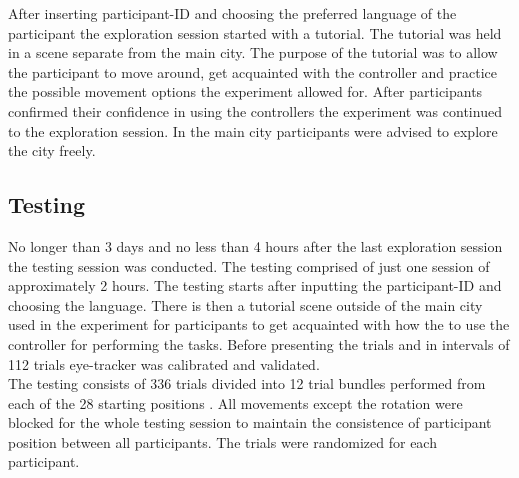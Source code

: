 After inserting participant-ID and choosing the preferred language of the participant the exploration session started with a tutorial. The tutorial was held in a scene separate from the main city. The purpose of the tutorial was to allow the participant to move around, get acquainted with the controller and practice the possible movement options the experiment allowed for. After participants confirmed their confidence in using the controllers the experiment was continued to the exploration session. In the main city participants were advised to explore the city freely.

\subsection{Testing}

No longer than 3 days and no less than 4 hours after the last exploration session the testing session was conducted. The testing comprised of just one session of approximately 2 hours. The testing starts after inputting the participant-ID and choosing the language. There is then a tutorial scene outside of the main city used in the experiment for participants to get acquainted with how the to use the controller for performing the tasks. Before presenting the trials and in intervals of 112 trials eye-tracker was calibrated and validated. \\

The testing consists of 336 trials divided into 12 trial bundles performed from each of the 28 starting positions . All movements except the rotation were blocked for the whole testing session to maintain the consistence of participant position between all participants. The trials were randomized for each participant. 

 \\

